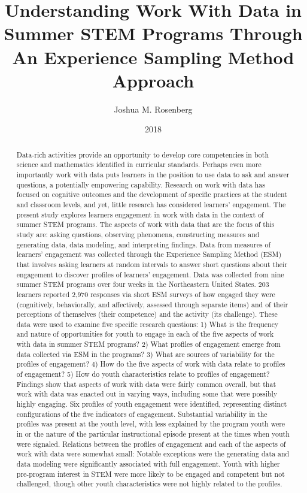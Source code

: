 \documentclass[]{msu-thesis}
\title{Understanding Work With Data in Summer STEM Programs Through An Experience Sampling Method Approach}
\author{Joshua M. Rosenberg}
\date{2018}
\theoremstyle{definition}
\theoremstyle{definition}
\theoremstyle{definition}
\theoremstyle{remark}
\begin{document}

\maketitlepage
\begin{abstract}
Data-rich activities provide an opportunity to develop core competencies in both science and mathematics identified in curricular standards. Perhaps even more importantly work with data puts learners in the position to use data to ask and answer questions, a potentially empowering capability. Research on work with data has focused on cognitive outcomes and the development of specific practices at the student and classroom levels, and yet, little research has considered learners’ engagement. The present study explores learners engagement in work with data in the context of summer STEM programs. The aspects of work with data that are the focus of this study are: asking questions, observing phenomena, constructing measures and generating data, data modeling, and interpreting findings. Data from measures of learners' engagement was collected through the Experience Sampling Method (ESM) that involves asking learners at random intervals to answer short questions about their engagement to discover profiles of learners' engagement.
Data was collected from nine summer STEM programs over four weeks in the Northeastern United States. 203 learners reported 2,970 responses via short ESM surveys of how engaged they were (cognitively, behaviorally, and affectively, assessed through separate items) and of their perceptions of themselves (their competence) and the activity (its challenge).  These data were used to examine five specific research questions: 1) What is the frequency and nature of opportunities for youth to engage in each of the five aspects of work with data in summer STEM programs? 2) What profiles of engagement emerge from data collected via ESM in the programs? 3) What are sources of variability for the profiles of engagement? 4) How do the five aspects of work with data relate to profiles of engagement? 5) How do youth characteristics relate to profiles of engagement?
Findings show that aspects of work with data were fairly common overall, but that work with data was enacted out in varying ways, including some that were possibly highly engaging. Six profiles of youth engagement were identified, representing distinct configurations of the five indicators of engagement. Substantial variability in the profiles was present at the youth level, with less explained by the program youth were in or the nature of the particular instructional episode present at the times when youth were signaled. Relations between the profiles of engagement and each of the aspects of work with data were somewhat small: Notable exceptions were the generating data and data modeling were significantly associated with full engagement. Youth with higher pre-program interest in STEM were more likely to be engaged and competent but not challenged, though other youth characteristics were not highly related to the profiles.

\end{abstract}
\end{document}
